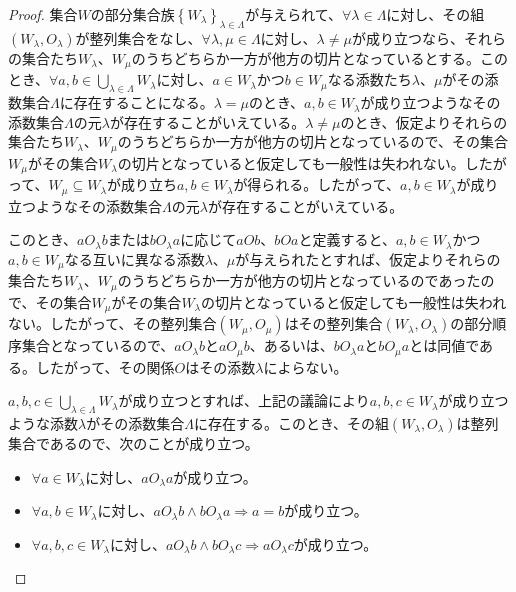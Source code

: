 \documentclass[dvipdfmx]{jsarticle}
\begin{document}
\begin{proof}
集合$W$の部分集合族$\left\{ W_{\lambda} \right\}_{\lambda \in \varLambda }$が与えられて、$\forall\lambda \in \varLambda $に対し、その組$\left( W_{\lambda},O_{\lambda} \right)$が整列集合をなし、$\forall\lambda,\mu \in \varLambda $に対し、$\lambda \neq \mu$が成り立つなら、それらの集合たち$W_{\lambda}$、$W_{\mu}$のうちどちらか一方が他方の切片となっているとする。このとき、$\forall a,b \in \bigcup_{\lambda \in \varLambda } W_{\lambda}$に対し、$a \in W_{\lambda}$かつ$b \in W_{\mu}$なる添数たち$\lambda$、$\mu$がその添数集合$\varLambda $に存在することになる。$\lambda = \mu$のとき、$a,b \in W_{\lambda}$が成り立つようなその添数集合$\varLambda $の元$\lambda$が存在することがいえている。$\lambda \neq \mu$のとき、仮定よりそれらの集合たち$W_{\lambda}$、$W_{\mu}$のうちどちらか一方が他方の切片となっているので、その集合$W_{\mu}$がその集合$W_{\lambda}$の切片となっていると仮定しても一般性は失われない。したがって、$W_{\mu} \subseteq W_{\lambda}$が成り立ち$a,b \in W_{\lambda}$が得られる。したがって、$a,b \in W_{\lambda}$が成り立つようなその添数集合$\varLambda $の元$\lambda$が存在することがいえている。\par
このとき、$aO_{\lambda}b$または$bO_{\lambda}a$に応じて$aOb$、$bOa$と定義すると、$a,b \in W_{\lambda}$かつ$a,b \in W_{\mu}$なる互いに異なる添数$\lambda$、$\mu$が与えられたとすれば、仮定よりそれらの集合たち$W_{\lambda}$、$W_{\mu}$のうちどちらか一方が他方の切片となっているのであったので、その集合$W_{\mu}$がその集合$W_{\lambda}$の切片となっていると仮定しても一般性は失われない。したがって、その整列集合$\left( W_{\mu},O_{\mu} \right)$はその整列集合$\left( W_{\lambda},O_{\lambda} \right)$の部分順序集合となっているので、$aO_{\lambda}b$と$aO_{\mu}b$、あるいは、$bO_{\lambda}a$と$bO_{\mu}a$とは同値である。したがって、その関係$O$はその添数$\lambda$によらない。\par
$a,b,c \in \bigcup_{\lambda \in \varLambda } W_{\lambda}$が成り立つとすれば、上記の議論により$a,b,c \in W_{\lambda}$が成り立つような添数$\lambda$がその添数集合$\varLambda $に存在する。このとき、その組$\left( W_{\lambda},O_{\lambda} \right)$は整列集合であるので、次のことが成り立つ。
\begin{itemize}
\item
  $\forall a \in W_{\lambda}$に対し、$aO_{\lambda}a$が成り立つ。
\item
  $\forall a,b \in W_{\lambda}$に対し、$aO_{\lambda}b \land bO_{\lambda}a \Rightarrow a = b$が成り立つ。
\item
  $\forall a,b,c \in W_{\lambda}$に対し、$aO_{\lambda}b \land bO_{\lambda}c \Rightarrow aO_{\lambda}c$が成り立つ。

\end{itemize}
\end{proof}
\end{document}

